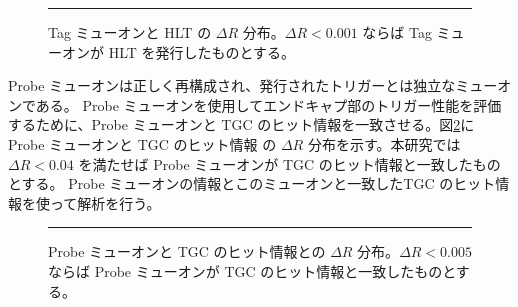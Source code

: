 \begin{figure}[tb]
  \centering
  \rule{8cm}{6cm}
  \caption{Tag ミューオンと HLT の $\Delta R$ 分布。$\Delta R < 0.001$ ならば Tag ミューオンが HLT を発行したものとする。}
  \label{fig:tag_HLT}
\end{figure}

Probe ミューオンは正しく再構成され、発行されたトリガーとは独立なミューオンである。
Probe ミューオンを使用してエンドキャプ部のトリガー性能を評価するために、Probe ミューオンと TGC のヒット情報を一致させる。図\ref{fig:Probe_TGC}に Probe ミューオンと TGC のヒット情報 の $\Delta R$ 分布を示す。本研究では$\Delta R < 0.04$ を満たせば Probe ミューオンが TGC のヒット情報と一致したものとする。
Probe ミューオンの情報とこのミューオンと一致したTGC のヒット情報を使って解析を行う。

\begin{figure}[tb]
  \centering
  \rule{8cm}{6cm}
  \caption{Probe ミューオンと TGC のヒット情報との $\Delta R$ 分布。$\Delta R < 0.005$ ならば Probe ミューオンが TGC のヒット情報と一致したものとする。}
  \label{fig:Probe_TGC}
\end{figure}



